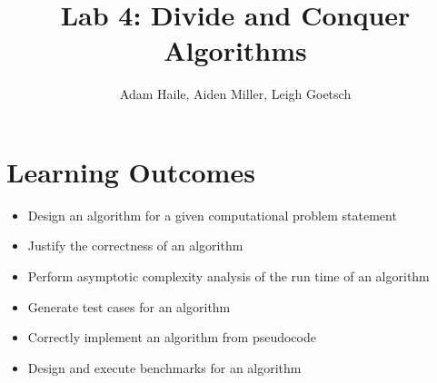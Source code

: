 \documentclass{labReport}
\title{Lab 4: Divide and Conquer Algorithms}
\author{Adam Haile, Aiden Miller, Leigh Goetsch}
\begin{document}
\maketitle

\section*{Learning Outcomes}
\begin{itemize}
    \item Design an algorithm for a given computational problem statement
    \item Justify the correctness of an algorithm
    \item Perform asymptotic complexity analysis of the run time of an algorithm
    \item Generate test cases for an algorithm
    \item Correctly implement an algorithm from pseudocode
    \item Design and execute benchmarks for an algorithm
\end{itemize}

\end{document}
